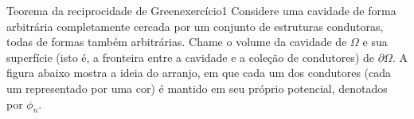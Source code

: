 \begin{exercício}{Teorema da reciprocidade de Green}{exercício1}
    Considere uma cavidade de forma arbitrária completamente cercada por um conjunto de estruturas condutoras, todas de formas também arbitrárias. Chame o volume da cavidade de \(\Omega\) e sua superfície (isto é, a fronteira entre a cavidade e a coleção de condutores) de \(\partial \Omega\). A figura abaixo mostra a ideia do arranjo, em que cada um dos condutores (cada um representado por uma cor) é mantido em seu próprio potencial, denotados por \(\phi_n\).

    \begin{center}
\end{center}
\end{exercício}
